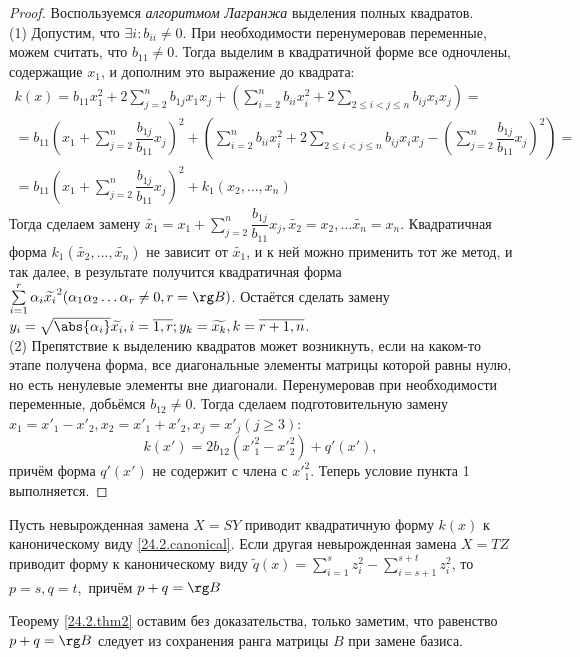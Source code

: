   \begin{proof} Воспользуемся \textit{алгоритмом Лагранжа} выделения полных квадратов.\\
  (1) Допустим,	что $\exists i: b_{ii} \neq 0$. При 	необходимости перенумеровав переменные, можем считать, что $b_{11} \neq 0$. Тогда выделим в квадратичной форме все одночлены, содержащие $x_1$, и дополним это выражение до квадрата:
  \begin{equation*}\begin{array}{crl}
  k(x)=b_{11}x_1^2+2\sum\limits_{j=2}^nb_{1j}x_1x_j+(\sum\limits_{i=2}^nb_{ii}x_i^2+2\sum\limits_{2\le i<j\le n} b_{ij}x_ix_j)=\\
  =b_{11}(x_1+\sum\limits_{j=2}^n\dfrac{b_{1j}}{b_{11}}x_j)^2+(\sum\limits_{i=2}^nb_{ii}x_i^2+2\sum\limits_{2\le i<j\le n} b_{ij}x_ix_j-(\sum\limits_{j=2}^n\dfrac{b_{1j}}{b_{11}}x_j)^2)=\\
  =b_{11}(x_1+\sum\limits_{j=2}^n\dfrac{b_{1j}}{b_{11}}x_j)^2+k_1(x_2,\ldots, x_n)
  \end{array}\end{equation*}
  Тогда сделаем замену $\widetilde{x_1}=x_1+\sum\limits_{j=2}^n\dfrac{b_{1j}}{b_{11}}x_j, \widetilde{x_2}=x_2,\ldots \widetilde{x_n}=x_n$. Квадратичная форма $k_1(\widetilde{x_2},\ldots, \widetilde{x_n})$ не зависит от $\widetilde{x_1}$, и к ней можно применить тот же метод, и так далее, в результате получится квадратичная форма $\sum\limits_{i=1}^r\alpha_i\widetilde{x_i}^2 (\alpha_1\alpha_2\ldots\alpha_r \neq 0, r=\rg B)$. Остаётся сделать замену $y_i=\sqrt{\abs{\alpha_i}}\widetilde{x_i}, i=\overline{1,r}; y_k=\widetilde{x_k}, k=\overline{r+1,n}$.\\
  (2) Препятствие к выделению квадратов может возникнуть, если на каком-то этапе получена форма, все диагональные элементы матрицы которой равны нулю, но есть ненулевые элементы вне диагонали. Перенумеровав при необходимости переменные, добьёмся $b_{12} \neq 0$. Тогда сделаем подготовительную замену $x_1=x'_1-x'_2,x_2=x'_1+x'_2,x_j=x'_j (j \ge 3)$:
  \begin{equation*}
  k(x')=2b_{12}({x'}_1^2-{x'}_2^2)+q'(x'),
  \end{equation*}
  причём форма $q'(x')$ не содержит с члена с ${x'}_1^2$. Теперь условие пункта 1 выполняется.
  \end{proof}
  
  \begin{thm}\label{24.2.thm2}
  Пусть невырожденная замена $X=SY$ приводит квадратичную форму $k(x)$ к каноническому виду \eqref{24.2.canonical}. Если другая невырожденная замена $X=TZ$ приводит форму к каноническому виду $\widetilde q(x)=\sum\limits_{i=1}^sz_i^2-\sum\limits_{i=s+1}^{s+t}z_i^2$, то $p=s,q=t,$ причём $p+q=\rg B$
  \end{thm} 
  Теорему \ref{24.2.thm2} оставим без доказательства, только заметим, что равенство $p+q=\rg B$ следует из сохранения ранга матрицы $B$ при замене базиса.